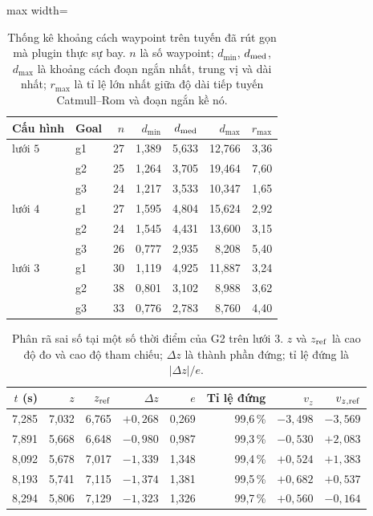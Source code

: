\begin{table}[!t]
  \caption{Thống kê khoảng cách waypoint trên tuyến đã rút gọn mà plugin thực sự
    bay. $n$ là số waypoint; $d_{\min}$, $d_{\rm med}$, $d_{\max}$ là khoảng cách
    đoạn ngắn nhất, trung vị và dài nhất; $r_{\max}$ là tỉ lệ lớn nhất giữa độ dài
    tiếp tuyến Catmull--Rom và đoạn ngắn kề nó.}
  \label{tab:waypoints}
  {\fontsize{7}{8.6}\selectfont
  \begin{adjustbox}{max width=\textwidth}
  \begin{tabular}{@{}llrrrrr@{}}
    \toprule
    Cấu hình & Goal & $n$ & $d_{\min}$ & $d_{\rm med}$ & $d_{\max}$ & $r_{\max}$ \\
    \midrule
    lưới $5$ & g1 & 27 & 1,389 & 5,633 & 12,766 & 3,36 \\
             & g2 & 25 & 1,264 & 3,705 & 19,464 & 7,60 \\
             & g3 & 24 & 1,217 & 3,533 & 10,347 & 1,65 \\
    \midrule
    lưới $4$ & g1 & 27 & 1,595 & 4,804 & 15,624 & 2,92 \\
             & g2 & 24 & 1,545 & 4,431 & 13,600 & 3,15 \\
             & g3 & 26 & 0,777 & 2,935 &  8,208 & 5,40 \\
    \midrule
    lưới $3$ & g1 & 30 & 1,119 & 4,925 & 11,887 & 3,24 \\
             & g2 & 38 & 0,801 & 3,102 &  8,988 & 3,62 \\
             & g3 & 33 & 0,776 & 2,783 &  8,760 & 4,40 \\
    \bottomrule
  \end{tabular}
  \end{adjustbox}}
\end{table}

\begin{table}[!t]
  \caption{Phân rã sai số tại một số thời điểm của G2 trên lưới $3$. $z$ và
    $z_{\rm ref}$ là cao độ đo và cao độ tham chiếu; $\Delta z$ là thành phần
    đứng; tỉ lệ đứng là $|\Delta z|/e$.}
  \label{tab:g2vertical}
  {\fontsize{7}{8.6}\selectfont
  \begin{tabular}{@{}rrrrrrrr@{}}
    \toprule
    $t$ (s) & $z$ & $z_{\rm ref}$ & $\Delta z$ & $e$ & Tỉ lệ đứng
      & $v_z$ & $v_{z,\rm ref}$ \\
    \midrule
    7,285 & 7,032 & 6,765 & $+0{,}268$ & 0,269 & 99,6\,\% & $-3{,}498$ & $-3{,}569$ \\
    7,891 & 5,668 & 6,648 & $-0{,}980$ & 0,987 & 99,3\,\% & $-0{,}530$ & $+2{,}083$ \\
    8,092 & 5,678 & 7,017 & $-1{,}339$ & 1,348 & 99,4\,\% & $+0{,}524$ & $+1{,}383$ \\
    8,193 & 5,741 & 7,115 & $-1{,}374$ & 1,381 & 99,5\,\% & $+0{,}682$ & $+0{,}537$ \\
    8,294 & 5,806 & 7,129 & $-1{,}323$ & 1,326 & 99,7\,\% & $+0{,}560$ & $-0{,}164$ \\
    \bottomrule
  \end{tabular}}
\end{table}

